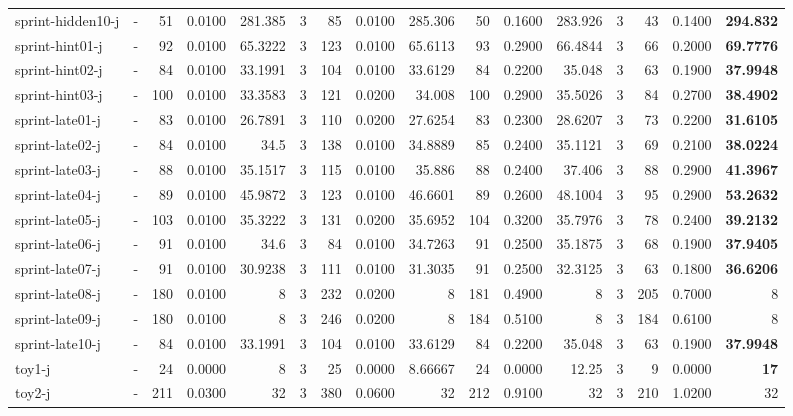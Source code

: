 \documentclass[a4paper]{article}
\begin{document}
\begin{sidewaystable}[h]
\begin{tabular}{l|r|r|r|r|r|r|r|r|r|r|r|r|r|r|r}
sprint-hidden10-j & \multicolumn{1}{c|}{ - } & 51 & 0.0100 & 281.385 & 3 & 85 & 0.0100 & 285.306 & 50 & 0.1600 & 283.926 & 3 & 43 & 0.1400 & \textbf{294.832} \\
sprint-hint01-j & \multicolumn{1}{c|}{ - } & 92 & 0.0100 & 65.3222 & 3 & 123 & 0.0100 & 65.6113 & 93 & 0.2900 & 66.4844 & 3 & 66 & 0.2000 & \textbf{69.7776} \\
sprint-hint02-j & \multicolumn{1}{c|}{ - } & 84 & 0.0100 & 33.1991 & 3 & 104 & 0.0100 & 33.6129 & 84 & 0.2200 & 35.048 & 3 & 63 & 0.1900 & \textbf{37.9948} \\
sprint-hint03-j & \multicolumn{1}{c|}{ - } & 100 & 0.0100 & 33.3583 & 3 & 121 & 0.0200 & 34.008 & 100 & 0.2900 & 35.5026 & 3 & 84 & 0.2700 & \textbf{38.4902} \\
sprint-late01-j & \multicolumn{1}{c|}{ - } & 83 & 0.0100 & 26.7891 & 3 & 110 & 0.0200 & 27.6254 & 83 & 0.2300 & 28.6207 & 3 & 73 & 0.2200 & \textbf{31.6105} \\
sprint-late02-j & \multicolumn{1}{c|}{ - } & 84 & 0.0100 & 34.5 & 3 & 138 & 0.0100 & 34.8889 & 85 & 0.2400 & 35.1121 & 3 & 69 & 0.2100 & \textbf{38.0224} \\
sprint-late03-j & \multicolumn{1}{c|}{ - } & 88 & 0.0100 & 35.1517 & 3 & 115 & 0.0100 & 35.886 & 88 & 0.2400 & 37.406 & 3 & 88 & 0.2900 & \textbf{41.3967} \\
sprint-late04-j & \multicolumn{1}{c|}{ - } & 89 & 0.0100 & 45.9872 & 3 & 123 & 0.0100 & 46.6601 & 89 & 0.2600 & 48.1004 & 3 & 95 & 0.2900 & \textbf{53.2632} \\
sprint-late05-j & \multicolumn{1}{c|}{ - } & 103 & 0.0100 & 35.3222 & 3 & 131 & 0.0200 & 35.6952 & 104 & 0.3200 & 35.7976 & 3 & 78 & 0.2400 & \textbf{39.2132} \\
sprint-late06-j & \multicolumn{1}{c|}{ - } & 91 & 0.0100 & 34.6 & 3 & 84 & 0.0100 & 34.7263 & 91 & 0.2500 & 35.1875 & 3 & 68 & 0.1900 & \textbf{37.9405} \\
sprint-late07-j & \multicolumn{1}{c|}{ - } & 91 & 0.0100 & 30.9238 & 3 & 111 & 0.0100 & 31.3035 & 91 & 0.2500 & 32.3125 & 3 & 63 & 0.1800 & \textbf{36.6206} \\
sprint-late08-j & \multicolumn{1}{c|}{ - } & 180 & 0.0100 & 8 & 3 & 232 & 0.0200 & 8 & 181 & 0.4900 & 8 & 3 & 205 & 0.7000 & 8 \\
sprint-late09-j & \multicolumn{1}{c|}{ - } & 180 & 0.0100 & 8 & 3 & 246 & 0.0200 & 8 & 184 & 0.5100 & 8 & 3 & 184 & 0.6100 & 8 \\
sprint-late10-j & \multicolumn{1}{c|}{ - } & 84 & 0.0100 & 33.1991 & 3 & 104 & 0.0100 & 33.6129 & 84 & 0.2200 & 35.048 & 3 & 63 & 0.1900 & \textbf{37.9948} \\
toy1-j & \multicolumn{1}{c|}{ - } & 24 & 0.0000 & 8 & 3 & 25 & 0.0000 & 8.66667 & 24 & 0.0000 & 12.25 & 3 & 9 & 0.0000 & \textbf{17} \\
toy2-j & \multicolumn{1}{c|}{ - } & 211 & 0.0300 & 32 & 3 & 380 & 0.0600 & 32 & 212 & 0.9100 & 32 & 3 & 210 & 1.0200 & 32 \\
\hline
\end{tabular} 
\end{sidewaystable}
\end{document}
